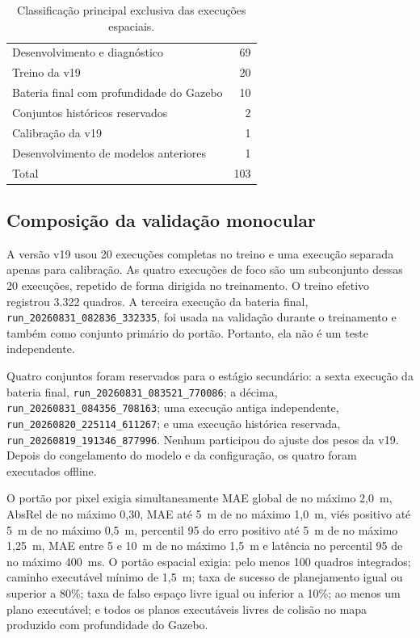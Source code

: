 \begin{table}[htb]
\centering
\caption{Classificação principal exclusiva das execuções espaciais.}
\label{tab:mono-composicao-espacial}
\begin{tabular}{lr}
\hline
Desenvolvimento e diagnóstico & 69 \\
Treino da v19 & 20 \\
Bateria final com profundidade do Gazebo & 10 \\
Conjuntos históricos reservados & 2 \\
Calibração da v19 & 1 \\
Desenvolvimento de modelos anteriores & 1 \\
Total & 103 \\
\hline
\end{tabular}
\end{table}

\subsection{Composição da validação monocular}

A versão v19 usou 20 execuções completas no treino e uma execução separada apenas para calibração. As quatro execuções de foco são um subconjunto dessas 20 execuções, repetido de forma dirigida no treinamento. O treino efetivo registrou 3.322 quadros. A terceira execução da bateria final, \texttt{run\_20260831\_082836\_332335}, foi usada na validação durante o treinamento e também como conjunto primário do portão. Portanto, ela não é um teste independente.

Quatro conjuntos foram reservados para o estágio secundário: a sexta execução da bateria final, \texttt{run\_20260831\_083521\_770086}; a décima, \texttt{run\_20260831\_084356\_708163}; uma execução antiga independente, \texttt{run\_20260820\_225114\_611267}; e uma execução histórica reservada, \texttt{run\_20260819\_191346\_877996}. Nenhum participou do ajuste dos pesos da v19. Depois do congelamento do modelo e da configuração, os quatro foram executados offline.

O portão por pixel exigia simultaneamente MAE global de no máximo 2,0~m, AbsRel de no máximo 0,30, MAE até 5~m de no máximo 1,0~m, viés positivo até 5~m de no máximo 0,5~m, percentil 95 do erro positivo até 5~m de no máximo 1,25~m, MAE entre 5 e 10~m de no máximo 1,5~m e latência no percentil 95 de no máximo 400~ms. O portão espacial exigia: pelo menos 100 quadros integrados; caminho executável mínimo de 1,5~m; taxa de sucesso de planejamento igual ou superior a 80\%; taxa de falso espaço livre igual ou inferior a 10\%; ao menos um plano executável; e todos os planos executáveis livres de colisão no mapa produzido com profundidade do Gazebo.

